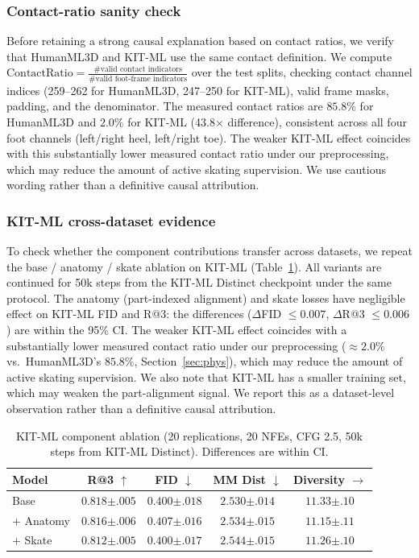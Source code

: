 \documentclass[journal]{IEEEtran}
\begin{document}
\subsubsection{Contact-ratio sanity check}
\label{sec:contact-check}
Before retaining a strong causal explanation based on contact ratios, we verify that HumanML3D and KIT-ML use the same contact definition. We compute $\text{ContactRatio} = \frac{\#\text{valid contact indicators}}{\#\text{valid foot-frame indicators}}$ over the test splits, checking contact channel indices (259--262 for HumanML3D, 247--250 for KIT-ML), valid frame masks, padding, and the denominator. The measured contact ratios are $85.8\%$ for HumanML3D and $2.0\%$ for KIT-ML (43.8$\times$ difference), consistent across all four foot channels (left/right heel, left/right toe). The weaker KIT-ML effect coincides with this substantially lower measured contact ratio under our preprocessing, which may reduce the amount of active skating supervision. We use cautious wording rather than a definitive causal attribution.

\subsubsection{KIT-ML cross-dataset evidence}
\label{sec:kit-ablate}

To check whether the component contributions transfer across datasets, we repeat the base / anatomy / skate ablation on KIT-ML (Table~\ref{tab:kit-ablate}). All variants are continued for 50k steps from the KIT-ML Distinct checkpoint under the same protocol. The anatomy (part-indexed alignment) and skate losses have negligible effect on KIT-ML FID and R@3: the differences ($\Delta$FID $\le 0.007$, $\Delta$R@3 $\le 0.006$) are within the 95\% CI. The weaker KIT-ML effect coincides with a substantially lower measured contact ratio under our preprocessing ($\approx2.0\%$ vs.\ HumanML3D's $85.8\%$, Section~\ref{sec:phys}), which may reduce the amount of active skating supervision. We also note that KIT-ML has a smaller training set, which may weaken the part-alignment signal. We report this as a dataset-level observation rather than a definitive causal attribution.

\begin{table}[t]
\centering
\caption{KIT-ML component ablation (20 replications, 20 NFEs, CFG 2.5, 50k steps from KIT-ML Distinct). Differences are within CI.}
\label{tab:kit-ablate}
\small
\setlength{\tabcolsep}{2.6pt}
\begin{tabular}{@{}lcccc@{}}
\toprule
Model & R@3 $\uparrow$ & FID $\downarrow$ & MM Dist $\downarrow$ & Diversity $\rightarrow$ \\
\midrule
Base & $0.818{\pm.005}$ & $0.400{\pm.018}$ & $2.530{\pm.014}$ & $11.33{\pm.10}$ \\
$+$ Anatomy & $0.816{\pm.006}$ & $0.407{\pm.016}$ & $2.534{\pm.015}$ & $11.15{\pm.11}$ \\
$+$ Skate & $0.812{\pm.005}$ & $0.400{\pm.017}$ & $2.544{\pm.015}$ & $11.26{\pm.10}$ \\
\bottomrule
\end{tabular}
\end{table}
\end{document}
